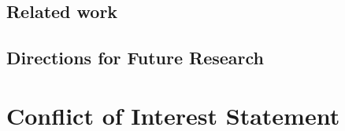 \documentclass[utf8]{frontiersSCNS}
\begin{document}
\subsection{Related work}

\subsection{Directions for Future Research}


\section*{Conflict of Interest Statement}
\end{document}
